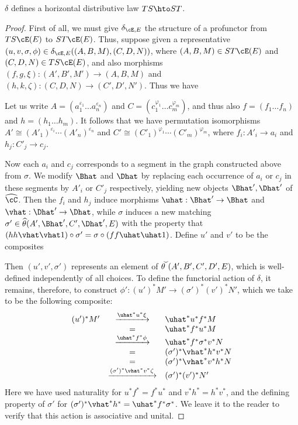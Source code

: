 \documentclass{amsart}
\newcommand{\C}{\cC}
\renewcommand{\Chat}{\ensuremath{\widehat{\C}}\xspace}
\newcommand{\thhat}{\ensuremath{\widehat{\theta}}\xspace}
\newcommand{\thchk}{\ensuremath{\widecheck{\theta}}\xspace}
\newcommand{\E}{\cE}
\newcommand{\e}[1][]{^{\varepsilon_{#1}}}
\renewcommand{\ph}[1][]{^{\varphi_{#1}}}
\begin{document}
\begin{thm}
  $\delta$ defines a horizontal distributive law $TS \hto ST$.
\end{thm}
\begin{proof}
  First of all, we must give $\delta_{\E,E}$ the structure of a profunctor from $TS\E(E)$ to $ST\E(E)$.
  Thus, suppose given a representative $(u,v,\sigma,\phi)\in \delta_{\E,E}((A,B,M),(C,D,N))$, where $(A,B,M)\in ST\E(E)$ and $(C,D,N)\in TS\E(E)$, and also morphisms $(f,g,\xi):(A',B',M') \to (A,B,M)$ and $(h,k,\zeta):(C,D,N)\to (C',D',N')$.
  Thus we have
  Let us write $A=(a_1\e[1]\dots a_n\e[n])$ and $C=(c_1\ph[1]\dots c_m\ph[m])$, and thus also $f=(f_1\dots f_n)$ and $h=(h_1\dots h_m)$.
  It follows that we have permutation isomorphisms $A' \cong (A'_1)\e[i]\cdots (A'_n)\e[n]$ and $C'\cong (C'_1)\ph[1]\cdots (C'_m)\ph[m]$, where $f_i:A'_i\to a_i$ and $h_j:C'_j \to c_j$.

  Now each $a_i$ and $c_j$ corresponds to a segment in the graph constructed above from $\sigma$.
  We modify $\Bhat$ and $\Dhat$ by replacing each occurrence of $a_i$ or $c_j$ in these segments by $A'_i$ or $C'_j$ respectively, yielding new objects $\Bhat',\Dhat'$ of $\Chat$.
  Then the $f_i$ and $h_j$ induce morphisms $\uhat : \Bhat'\to \Bhat$ and $\vhat:\Dhat'\to\Dhat$, while $\sigma$ induces a new matching $\sigma' \in \thhat(A',\Bhat',C',\Dhat',E)$ with the property that $(hh\vhat\vhat1)\circ \sigma' = \sigma\circ (ff\uhat\uhat1)$.
  Define $u'$ and $v'$ to be the composites
  Then $(u',v',\sigma')$ represents an element of $\thchk(A',B',C',D',E)$, which is well-defined independently of all choices.
  To define the functorial action of $\delta$, it remains, therefore, to construct $\phi' : (u')^* M' \to (\sigma')^*(v')^* N'$, which we take to be the following composite:
  \[\begin{array}{rcl}
    (u')^* M' &\xto{\uhat^* u^* \xi}& \uhat^* u^* f^*M\\
    &=& \uhat^* f^* u^* M\\
    &\xto{\uhat^* f^* \phi}& \uhat^* f^* \sigma^* v^* N \\
    &=& (\sigma')^* \vhat^* h^* v^* N\\
    &=& (\sigma')^* \vhat^* v^* h^* N\\
    &\xto{(\sigma')^*\vhat^* v^* \zeta}& (\sigma')^*(v')^* N'
  \end{array}\]
  Here we have used naturality for $u^* f^* = f^* u^*$ and $v^* h^* = h^* v^*$, and the defining property of $\sigma'$ for $(\sigma')^* \vhat^* h^* = \uhat^* f^* \sigma^*$.
  We leave it to the reader to verify that this action is associative and unital.


\end{proof}
\end{document}

